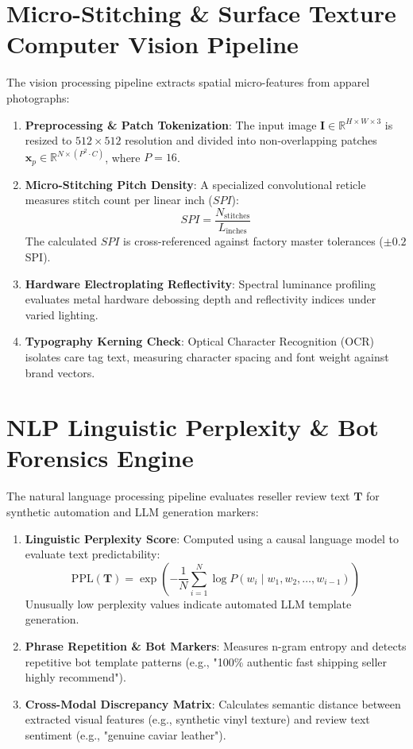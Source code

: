 \section{Micro-Stitching & Surface Texture Computer Vision Pipeline}
The vision processing pipeline extracts spatial micro-features from apparel photographs:
\begin{enumerate}
    \item \textbf{Preprocessing \& Patch Tokenization}: The input image $\mathbf{I} \in \mathbb{R}^{H \times W \times 3}$ is resized to $512 \times 512$ resolution and divided into non-overlapping patches $\mathbf{x}_p \in \mathbb{R}^{N \times (P^2 \cdot C)}$, where $P=16$.
    \item \textbf{Micro-Stitching Pitch Density}: A specialized convolutional reticle measures stitch count per linear inch ($SPI$):
    \begin{equation}
        SPI = \frac{N_{\text{stitches}}}{L_{\text{inches}}}
    \end{equation}
    The calculated $SPI$ is cross-referenced against factory master tolerances ($\pm 0.2$ SPI).
    \item \textbf{Hardware Electroplating Reflectivity}: Spectral luminance profiling evaluates metal hardware debossing depth and reflectivity indices under varied lighting.
    \item \textbf{Typography Kerning Check}: Optical Character Recognition (OCR) isolates care tag text, measuring character spacing and font weight against brand vectors.
\end{enumerate}

\section{NLP Linguistic Perplexity & Bot Forensics Engine}
The natural language processing pipeline evaluates reseller review text $\mathbf{T}$ for synthetic automation and LLM generation markers:
\begin{enumerate}
    \item \textbf{Linguistic Perplexity Score}: Computed using a causal language model to evaluate text predictability:
    \begin{equation}
        \text{PPL}(\mathbf{T}) = \exp \left( -\frac{1}{N} \sum_{i=1}^{N} \log P(w_i \mid w_1, w_2, \dots, w_{i-1}) \right)
    \end{equation}
    Unusually low perplexity values indicate automated LLM template generation.
    \item \textbf{Phrase Repetition \& Bot Markers}: Measures n-gram entropy and detects repetitive bot template patterns (e.g., "100\% authentic fast shipping seller highly recommend").
    \item \textbf{Cross-Modal Discrepancy Matrix}: Calculates semantic distance between extracted visual features (e.g., synthetic vinyl texture) and review text sentiment (e.g., "genuine caviar leather").
\end{enumerate}

